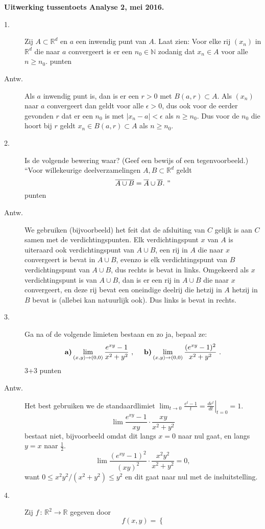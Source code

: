 \documentclass[12pt,dutch]{article}
\newcommand\ds{\displaystyle}
\begin{document}
{\bf Uitwerking tussentoets Analyse 2, mei 2016.}
\vskip 6pt
\begin{description}
\item[1.] Zij $A\subset \mathbb R^d$ en $a$ een inwendig punt van $A$. Laat zien:
Voor elke rij $(x_n)$ in $\mathbb R^d$ die naar $a$
convergeert is er een $n_0\in\mathbb N$ zodanig dat $x_n \in A$ voor alle
$n \ge n_0$.\hfill { punten}
\item[Antw.] Als $a$ inwendig punt is, dan is er een $r>0$ met $B(a,r)\subset A$.
Als $(x_n)$ naar $a$ convergeert dan geldt voor alle $\epsilon>0$, dus ook voor
de eerder gevonden $r$ dat er een $n_0$ is met $|x_n-a|<\epsilon$ als $n\ge n_0$.
Dus voor de $n_0$ die hoort bij $r$ geldt $x_n\in B(a,r)\subset A$ als $n\ge n_0$.
\item[2.] Is de volgende bewering waar? (Geef een bewijs of een tegenvoorbeeld.)\\
``Voor willekeurige deelverzamelingen $A,B \subset \mathbb R^d$ geldt
\[
\overline{A\cup B} = \overline A\cup \overline B.~"
\]
\hfill { punten}
\item[Antw.] We gebruiken (bijvoorbeeld) het feit dat de afsluiting van
$C$ gelijk is aan $C$ samen met de verdichtingspunten. Elk verdichtingspunt
$x$ van $A$ is uiteraard ook verdichtingspunt van $A\cup B$, een rij in $A$ die
naar $x$ convergeert is bevat in $A\cup B$, evenzo is elk verdichtingspunt
van $B$ verdichtingspunt van $A\cup B$, dus rechts is bevat in links.
Omgekeerd als $x$ verdichtingspunt is van $A\cup B$, dan is er een rij in $A\cup B$
die naar $x$ convergeert, en deze rij bevat een oneindige deelrij die hetzij in $A$
hetzij in $B$ bevat is (allebei kan natuurlijk ook). Dus links is bevat in rechts. 
\item[3.] Ga na of de volgende limieten bestaan en zo ja, bepaal ze:
\[
\mbox{\bf a)} \lim_{(x,y)\to(0,0)}\frac{e^{xy}-1}{x^2 + y^2}~,~~~~
\mbox{\bf b)} \lim_{(x,y)\to(0,0)}\frac{(e^{xy}-1)^2}{x^2+y^2}~.
\]
\hfill 3+3 {\sc punten}
\item[Antw.] Het best gebruiken we de standaardlimiet $\ds \lim_{t\to 0}\frac{e^t-1}t=\left.\frac{de^t}{dt}\right|_{t=0}=1$. 
\[
\lim\frac{e^{xy}-1}{xy}\cdot\frac{xy}{x^2+y^2}
\]
bestaat niet, bijvoorbeeld omdat dit langs $x=0$ naar nul gaat, en langs $y=x$ naar $\frac12$.
\[
\lim\frac{(e^{xy}-1)^2}{(xy)^2}\cdot\frac{x^2y^2}{x^2+y^2}=0,
\]
want $0\le x^2y^2/(x^2+y^2)\le y^2$ en dit gaat naar nul met de insluitstelling.
\item[4.] Zij $f\, :\, \mathbb R^2 \to \mathbb R$ gegeven door
\[
f(x,y) =\left\{ 
\]
\end{description}
\end{document}
